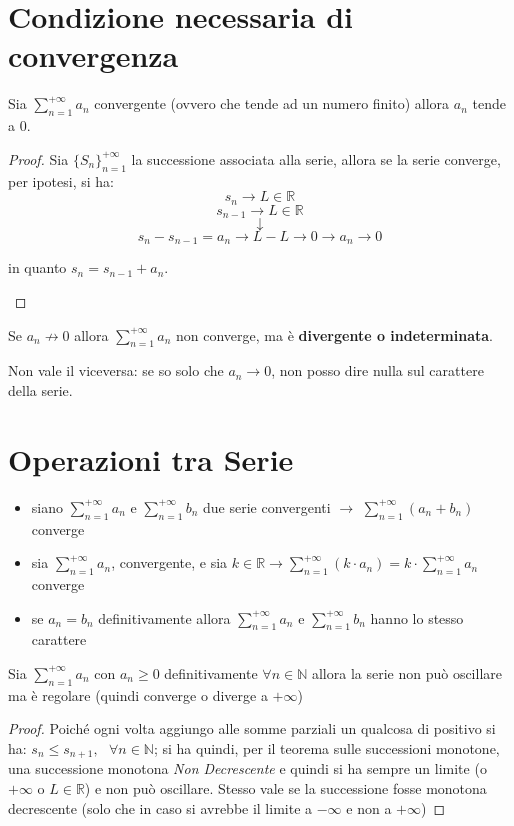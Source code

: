 \documentclass[a4paper,12pt, oneside]{book}
\begin{document}
\section{Condizione necessaria di convergenza}
\begin{teorema}
	Sia $\sum_{n=1}^{+\infty} a_n$ convergente (ovvero che tende ad un numero finito) allora $a_n$  tende a $0$.
\end{teorema}
\begin{proof}
	Sia ${\{S_n\}}_{n=1}^{+\infty}$ la successione associata alla serie, allora se la serie converge, per ipotesi, si ha:
	$$s_n \rightarrow L\in \mathbb{R}$$
	$$s_{n-1} \rightarrow L\in \mathbb{R}$$
	$$\downarrow$$
	$$s_n-s_{n-1}=a_n\rightarrow L-L\rightarrow 0 \longrightarrow a_n \rightarrow 0$$
	\begin{center}in quanto $s_n=s_{n-1}+a_n$.\end{center}
\end{proof}
\begin{nota}
	Se $a_n\not\rightarrow 0$ allora $\sum_{n=1}^{+\infty} a_n$  non converge, ma è \textbf{divergente o indeterminata}.
\end{nota}
\begin{nota}
	Non vale il viceversa: se so solo che $a_n\rightarrow 0$, non posso dire nulla sul carattere della serie.
\end{nota}


\section{Operazioni tra Serie}
\begin{itemize}
	\item siano $\sum_{n=1}^{+\infty} a_n$ e $\sum_{n=1}^{+\infty} b_n$ due serie convergenti $\longrightarrow$ $\sum_{n=1}^{+\infty} (a_n+b_n)$ converge
	\item sia $\sum_{n=1}^{+\infty} a_n$, convergente, e sia $k\in \mathbb{R} \longrightarrow \sum_{n=1}^{+\infty} (k\cdot a_n)=k\cdot \sum_{n=1}^{+\infty} a_n$ converge
	\item se $a_n=b_n$ definitivamente allora $\sum_{n=1}^{+\infty} a_n$ e $\sum_{n=1}^{+\infty} b_n$ hanno lo stesso carattere
\end{itemize}

\begin{teorema}
	Sia $\sum_{n=1}^{+\infty} a_n$ con $a_n\geq 0$ definitivamente $\forall n\in \mathbb{N}$ allora la serie non può oscillare ma è regolare (quindi converge o diverge a $+\infty$)
\end{teorema}
\begin{proof}
	Poiché ogni volta aggiungo alle somme parziali un qualcosa di positivo si ha: $s_n\leq s_{n+1},\mbox{ } \forall n\in \mathbb{N}$; si ha quindi, per il teorema sulle successioni monotone, una successione monotona \textit{Non Decrescente} e quindi si ha sempre un limite (o $+\infty$ o $L\in \mathbb{R}$) e non può oscillare. Stesso vale se la successione fosse monotona decrescente (solo che in caso si avrebbe il limite a $-\infty$ e non a $+\infty$)
\end{proof}
\end{document}
